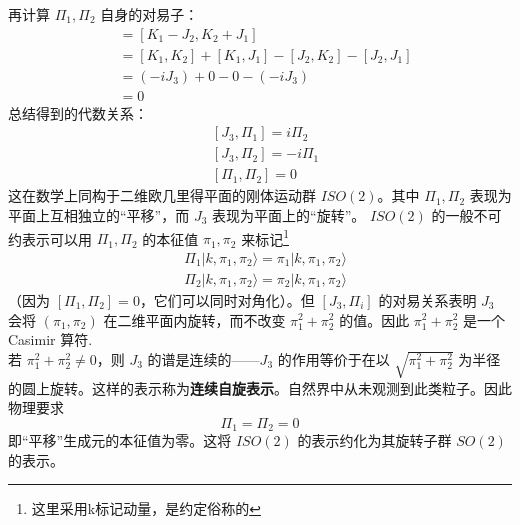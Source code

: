 再计算 $\Pi_1, \Pi_2$ 自身的对易子：
\begin{align}
    [\Pi_1, \Pi_2] &= [K_1 - J_2, K_2 + J_1] \nonumber \\
    &= [K_1, K_2] + [K_1, J_1] - [J_2, K_2] - [J_2, J_1] \nonumber \\
    &= (-iJ_3) + 0 - 0 - (-iJ_3) \nonumber \\
    &= 0
\end{align}
总结得到的代数关系：
\begin{subequations}
    \begin{align}
        & [J_3, \Pi_1] = i\Pi_2 \\
        & [J_3, \Pi_2] = -i\Pi_1 \\
        & [\Pi_1, \Pi_2] = 0
    \end{align}
\end{subequations}
这在数学上同构于二维欧几里得平面的刚体运动群 $ISO(2)$。其中 $\Pi_1, \Pi_2$ 表现为平面上互相独立的“平移”，而 $J_3$ 表现为平面上的“旋转”。
$ISO(2)$ 的一般不可约表示可以用 $\Pi_1,\Pi_2$ 的本征值 $\pi_1,\pi_2$ 来标记\footnote{这里采用k标记动量，是约定俗称的}
\begin{subequations}
    \begin{align}
        & \Pi_1|k,\pi_1,\pi_2\rangle = \pi_1 |k,\pi_1,\pi_2\rangle \\
        & \Pi_2|k,\pi_1,\pi_2\rangle = \pi_2 |k,\pi_1,\pi_2\rangle
    \end{align}
\end{subequations}
（因为 $[\Pi_1,\Pi_2]=0$，它们可以同时对角化）。\color{blue}但 $[J_3,\Pi_i]$ 的对易关系表明 $J_3$ 会将 $(\pi_1,\pi_2)$ 在二维平面内旋转，而不改变 $\pi_1^2+\pi_2^2$ 的值。因此 $\pi_1^2+\pi_2^2$ 是一个 Casimir 算符.\normalcolor
\vspace{2ex}
\\
若 $\pi_1^2+\pi_2^2 \neq 0$，则 $J_3$ 的谱是连续的——$J_3$ 的作用等价于在以 $\sqrt{\pi_1^2+\pi_2^2}$ 为半径的圆上旋转。这样的表示称为\textbf{连续自旋表示}。自然界中从未观测到此类粒子。因此物理要求
\begin{equation}
\Pi_1 = \Pi_2 = 0
\end{equation}
即``平移''生成元的本征值为零。这将 $ISO(2)$ 的表示约化为其旋转子群 $SO(2)$ 的表示。

